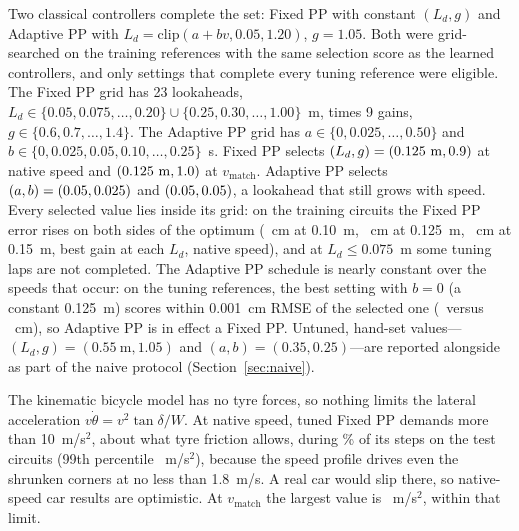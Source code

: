 \documentclass[conference]{IEEEtran}
\begin{document}
Two classical controllers complete the set: Fixed PP with constant $(L_d,g)$ and Adaptive PP with $L_d=\mathrm{clip}(a+bv,0.05,1.20)$, $g=1.05$. Both were grid-searched on the training references with the same selection score as the learned controllers, and only settings that complete every tuning reference were eligible. The Fixed PP grid has 23 lookaheads, $L_d\in\{0.05,0.075,\dots,0.20\}\cup\{0.25,0.30,\dots,1.00\}$~m, times 9 gains, $g\in\{0.6,0.7,\dots,1.4\}$. The Adaptive PP grid has $a\in\{0,0.025,\dots,0.50\}$ and $b\in\{0,0.025,0.05,0.10,\dots,0.25\}$~s. Fixed PP selects $(L_d,g)=(\VfixL\ \mathrm{m},\VfixG)$ at native speed and $(0.125\ \mathrm{m},1.0)$ at $v_{\mathrm{match}}$. Adaptive PP selects $(a,b)=(0.05,0.025)$ and $(0.05,0.05)$, a lookahead that still grows with speed. Every selected value lies inside its grid: on the training circuits the Fixed PP error rises on both sides of the optimum (\VtuneRa~cm at 0.10~m, \VtuneRb~cm at 0.125~m, \VtuneRc~cm at 0.15~m, best gain at each $L_d$, native speed), and at $L_d\le0.075$~m some tuning laps are not completed. The Adaptive PP schedule is nearly constant over the speeds that occur: on the tuning references, the best setting with $b=0$ (a constant 0.125~m) scores within 0.001~cm RMSE of the selected one (\VadRmseConst\ versus \VadRmseSel~cm), so Adaptive PP is in effect a Fixed PP. Untuned, hand-set values---$(L_d,g)=(0.55\ \mathrm{m},1.05)$ and $(a,b)=(0.35,0.25)$---are reported alongside as part of the naive protocol (Section~\ref{sec:naive}).

The kinematic bicycle model has no tyre forces, so nothing limits the lateral acceleration $v\dot\theta=v^2\tan\delta/W$. At native speed, tuned Fixed PP demands more than 10~m/s$^2$, about what tyre friction allows, during \VlatAccFrac\% of its steps on the test circuits (99th percentile \VlatAccP~m/s$^2$), because the speed profile drives even the shrunken corners at no less than 1.8~m/s. A real car would slip there, so native-speed car results are optimistic. At $v_{\mathrm{match}}$ the largest value is \VlatAccMaxM~m/s$^2$, within that limit.
\end{document}

